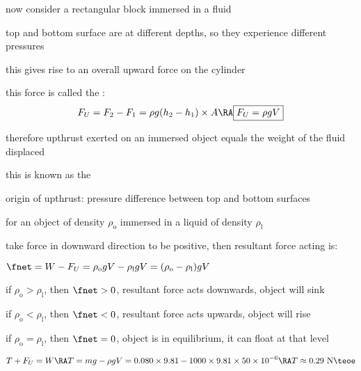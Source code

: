now consider a rectangular block immersed in a fluid

top and bottom surface are at different depths, so they experience different pressures

this gives rise to an overall upward force on the cylinder

this force is called the : 
$$ F_U = F_2 - F_1 = \rho g (h_2 - h_1) \times A \RA \boxed{F_U = \rho g V} $$

therefore upthrust exerted on an immersed object equals the weight of the fluid displaced

this is known as the  

\cmt origin of upthrust: pressure difference between top and bottom surfaces

\cmt for an object of density $\rho_\text{o}$ immersed in a liquid of density $\rho_\text{l}$

take force in downward direction to be positive, then resultant force acting is:

{
	\centering
	
	$ \fnet = W - F_U = \rho_\text{o} g V - \rho_\text{l} g V = (\rho_\text{o} - \rho_\text{l}) gV$
	
}

\titem if $\rho_\text{o} > \rho_\text{l}$, then $\fnet>0$, resultant force acts downwards, object will sink

\titem if $\rho_\text{o} < \rho_\text{l}$, then $\fnet<0$, resultant force acts upwards, object will rise

\titem if $\rho_\text{o} = \rho_\text{l}$, then $\fnet=0$, object is in equilibrium, it can float at that level


\solc\begin{equation*}
	T + F_U = W \RA T = mg - \rho g V = 0.080 \times 9.81 - 1000 \times 9.81 \times 50 \times 10^{-6} \RA T \approx 0.29 \text{ N} \teoe
\end{equation*}

